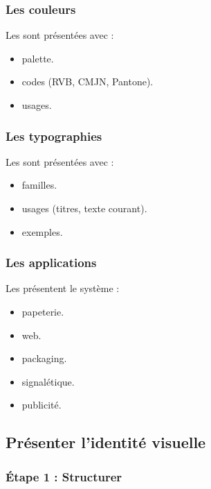 \subsubsection{Les couleurs}

Les  sont présentées avec :

\begin{itemize}
    \item {} palette.
    \item {} codes (RVB, CMJN, Pantone).
    \item {} usages.
\end{itemize}

\subsubsection{Les typographies}

Les  sont présentées avec :

\begin{itemize}
    \item {} familles.
    \item {} usages (titres, texte courant).
    \item {} exemples.
\end{itemize}

\subsubsection{Les applications}

Les  présentent le système :

\begin{itemize}
    \item {} papeterie.
    \item {} web.
    \item {} packaging.
    \item {} signalétique.
    \item {} publicité.
\end{itemize}

\subsection{Présenter l'identité visuelle}

\subsubsection{Étape 1 : Structurer}

